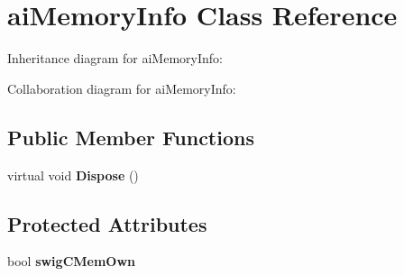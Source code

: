 \hypertarget{classai_memory_info}{\section{ai\+Memory\+Info Class Reference}
\label{classai_memory_info}
}


Inheritance diagram for ai\+Memory\+Info\+:


Collaboration diagram for ai\+Memory\+Info\+:
\subsection*{Public Member Functions}
\begin{DoxyCompactItemize}
\item 
\hypertarget{classai_memory_info_aa06c0650dcddd90f03da650398d6a1e9}{virtual void {\bfseries Dispose} ()}\label{classai_memory_info_aa06c0650dcddd90f03da650398d6a1e9}

\end{DoxyCompactItemize}
\subsection*{Protected Attributes}
\begin{DoxyCompactItemize}
\item 
\hypertarget{classai_memory_info_a9181a3a3d4f020279d0a87c2702ccf33}{bool {\bfseries swig\+C\+Mem\+Own}}\label{classai_memory_info_a9181a3a3d4f020279d0a87c2702ccf33}

\end{DoxyCompactItemize}
